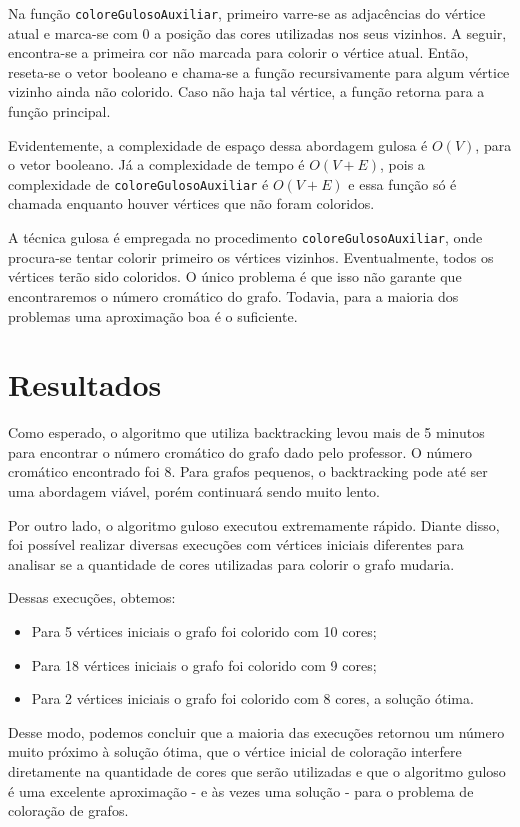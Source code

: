 \documentclass{article}
\begin{document}
Na função \texttt{coloreGulosoAuxiliar}, primeiro varre-se as adjacências do vértice atual e marca-se com 0 a posição das cores utilizadas nos seus vizinhos. A seguir, encontra-se a primeira cor não marcada para colorir o vértice atual. Então, reseta-se o vetor booleano e chama-se a função recursivamente para algum vértice vizinho ainda não colorido. Caso não haja tal vértice, a função retorna para a função principal.

Evidentemente, a complexidade de espaço dessa abordagem gulosa é $O(V)$, para o vetor booleano. Já a complexidade de tempo é $O(V+E)$, pois a complexidade de \texttt{coloreGulosoAuxiliar} é $O(V+E)$ e essa função só é chamada enquanto houver vértices que não foram coloridos.

A técnica gulosa é empregada no procedimento \texttt{coloreGulosoAuxiliar}, onde procura-se tentar colorir primeiro os vértices vizinhos. Eventualmente, todos os vértices terão sido coloridos. O único problema é que isso não garante que encontraremos o número cromático do grafo. Todavia, para a maioria dos problemas uma aproximação boa é o suficiente.

\section{Resultados}

Como esperado, o algoritmo que utiliza backtracking levou mais de 5 minutos para encontrar o número cromático do grafo dado pelo professor. O número cromático encontrado foi 8. Para grafos pequenos, o backtracking pode até ser uma abordagem viável, porém continuará sendo muito lento.

Por outro lado, o algoritmo guloso executou extremamente rápido. Diante disso, foi possível realizar diversas execuções com vértices iniciais diferentes para analisar se a quantidade de cores utilizadas para colorir o grafo mudaria.

Dessas execuções, obtemos:

\begin{itemize}
	\item Para 5 vértices iniciais o grafo foi colorido com 10 cores;
	\item Para 18 vértices iniciais o grafo foi colorido com 9 cores;
	\item Para 2 vértices iniciais o grafo foi colorido com 8 cores, a solução ótima.
\end{itemize}

Desse modo, podemos concluir que a maioria das execuções retornou um número muito próximo à solução ótima, que o vértice inicial de coloração interfere diretamente na quantidade de cores que serão utilizadas e que o algoritmo guloso é uma excelente aproximação - e às vezes uma solução - para o problema de coloração de grafos.
\end{document}
